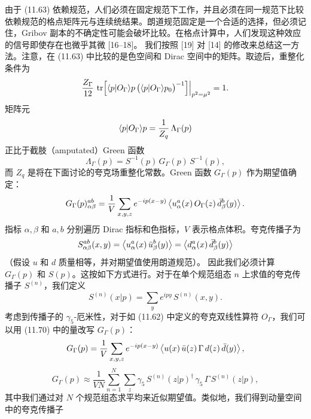 由于 (11.63) 依赖规范，人们必须在固定规范下工作，并且必须在同一规范下比较依赖规范的格点矩阵元与连续统结果。朗道规范固定是一个合适的选择，但必须记住，Gribov 副本的不确定性可能会破坏比较。在格点计算中，人们发现这种效应的信号即使存在也微乎其微 [16--18]。
我们按照 [19] 对 [14] 的修改来总结这一方法。注意，在 (11.63) 中比较的是色空间和 Dirac 空间中的矩阵。取迹后，重整化条件为
\begin{equation}
\frac{Z_\Gamma}{12}\,
\operatorname{tr}\Bigl[\langle p|O_\Gamma\rangle{p}\,\bigl(\langle p|O_\Gamma\rangle{p}_0\bigr)^{-1}\Bigr]
\Big|_{p^2 = \mu^2} = 1 .
\end{equation}
矩阵元
\begin{equation}
\langle p|O_\Gamma\rangle{p} = \frac{1}{Z_q}\,\Lambda_\Gamma(p)
\end{equation}
正比于截肢（amputated）Green 函数
\begin{equation}
\Lambda_\Gamma(p) = S^{-1}(p)\, G_\Gamma(p)\, S^{-1}(p) ,
\end{equation}
而 $Z_q$ 是将在下面讨论的夸克场重整化常数。Green 函数 $G_\Gamma(p)$ 作为期望值确定：
\begin{equation}
G_\Gamma(p)_{\alpha\beta}^{ab} =
\frac{1}{V}\sum_{x,y,z} e^{-ip(x-y)}
\left\langle u_\alpha^a(x)\, O_\Gamma(z)\, \bar{d}_\beta^b(y) \right\rangle .
\end{equation}
指标 $\alpha, \beta$ 和 $a, b$ 分别遍历 Dirac 指标和色指标，$V$ 表示格点体积。夸克传播子为
\begin{equation}
S_{\alpha\beta}^{ab}(x, y) = \left\langle u_\alpha^a(x)\, \bar{u}_\beta^b(y) \right\rangle
= \left\langle d_\alpha^a(x)\, \bar{d}_\beta^b(y) \right\rangle
\end{equation}
（假设 $u$ 和 $d$ 质量相等，并对期望值使用朗道规范）。
因此我们必须计算 $G_\Gamma(p)$ 和 $S(p)$。这按如下方式进行。对于在单个规范组态 $n$ 上求值的夸克传播子 $S^{(n)}$，我们定义
\begin{equation}
S^{(n)}(x|p) = \sum_y e^{ipy}\, S^{(n)}(x, y) .
\end{equation}
考虑到传播子的 $\gamma_5$-厄米性，对于如 (11.62) 中定义的夸克双线性算符 $O_\Gamma$，我们可以用 (11.70) 中的量改写 $G_\Gamma(p)$：
\begin{equation}
G_\Gamma(p) =
\frac{1}{V}\sum_{x,y,z} e^{-ip(x-y)}
\left\langle u(x)\,\bar{u}(z)\,\Gamma\, d(z)\,\bar{d}(y) \right\rangle ,
\end{equation}
\begin{equation}
G_\Gamma(p) \approx \frac{1}{VN}\sum_{n=1}^{N}\sum_z
\gamma_5\, S^{(n)}(z|p)^\dagger\, \gamma_5\, \Gamma\, S^{(n)}(z|p) ,
\end{equation}
其中我们通过对 $N$ 个规范组态求平均来近似期望值。类似地，我们得到动量空间中的夸克传播子
